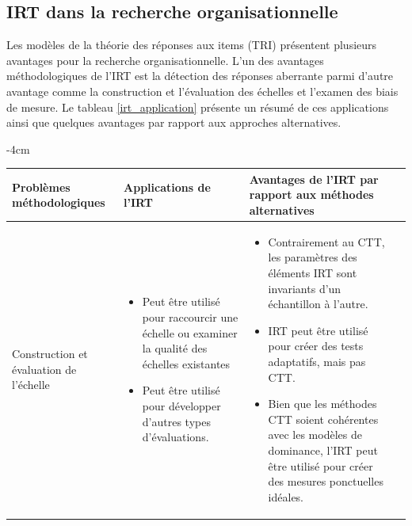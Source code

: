 \subsection{IRT dans la recherche organisationnelle}
Les modèles de la théorie des réponses aux items (TRI) présentent plusieurs avantages pour la recherche organisationnelle. L’un des avantages méthodologiques de l’IRT est la détection des réponses aberrante parmi d’autre avantage comme la construction et l’évaluation des échelles et l’examen des biais de mesure. Le tableau \ref{irt_application} présente un résumé de ces applications ainsi que quelques avantages par rapport aux approches alternatives.
\begin{table}[H]
	\centering
	\addtolength{\leftskip} {-4cm}
	\addtolength{\rightskip}{-4.5cm}
	\begin{tabular}{|m{4cm}|m{6cm}|m{6cm}|m{0.5cm}|}
	\hline
	\textbf{Problèmes méthodologiques} & \textbf{Applications de l'IRT} & \textbf{Avantages de l'IRT par rapport aux méthodes alternatives} & \\ \hline
	Construction et évaluation de l'échelle & 
	\begin{itemize}[leftmargin=*]
	    \item Peut être utilisé pour raccourcir une échelle ou examiner la qualité des échelles existantes
	    \item Peut être utilisé pour développer d'autres types d'évaluations.
	\end{itemize}
	& 
	\begin{itemize}[leftmargin=*]
		\item Contrairement au CTT, les paramètres des éléments IRT sont invariants d'un échantillon à l'autre.
		\item IRT peut être utilisé pour créer des tests adaptatifs, mais pas CTT.
		\item Bien que les méthodes CTT soient cohérentes avec les modèles de dominance, l'IRT peut être utilisé pour créer des mesures ponctuelles idéales.
	\end{itemize} & \cite{borman2001examination} \cite{carter2011using} \cite{chernyshenko2007constructing} \cite{roznowski1989examination} \cite{tay2009fitting}\\ \hline


\end{tabular}
\end{table}
